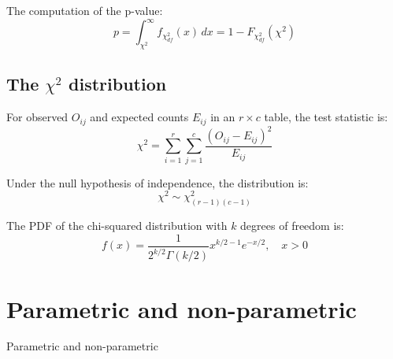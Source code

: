 \documentclass{book}
\begin{document}
The computation of the p-value:
\[
p = \int_{\chi^2}^{\infty} f_{\chi^2_{df}}(x)\,dx = 1 - F_{\chi^2_{df}}(\chi^2)
\]

\subsection*{The $\chi^{2}$ distribution}

For observed \( O_{ij} \) and expected counts \( E_{ij} \) in an \( r \times c \) table, the test statistic is:
\[
\chi^2 = \sum_{i=1}^{r} \sum_{j=1}^{c} \frac{(O_{ij} - E_{ij})^2}{E_{ij}}
\]

Under the null hypothesis of independence, the distribution is:
\[
\chi^2 \sim \chi^2_{(r-1)(c-1)}
\]

The PDF of the chi-squared distribution with \( k \) degrees of freedom is:
\[
f(x) = \frac{1}{2^{k/2} \Gamma(k/2)} x^{k/2 - 1} e^{-x/2}, \quad x > 0
\]

\cite{pearson1900}

\newpage

\section{Parametric and non-parametric}

Parametric and non-parametric
\end{document}

